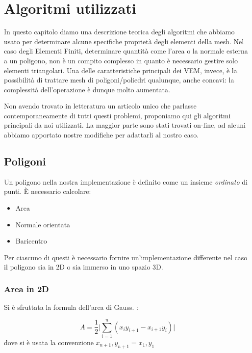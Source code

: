 \documentclass[oneside,12pt]{book}  %
\theoremstyle{plain}
\theoremstyle{definition}
\theoremstyle{remark}
\numberwithin{equation}{chapter} %
\begin{document}

\chapter{Algoritmi utilizzati}
\label{ch:algorithms}
In questo capitolo diamo una descrizione teorica degli algoritmi che
abbiamo usato per determinare alcune specifiche propriet\`a degli
elementi della mesh. Nel caso degli Elementi Finiti, determinare
quantit\`a come l'area o la normale esterna a un poligono, non \`e un
compito complesso in quanto \`e necessario gestire solo elementi
triangolari.
Una delle caratteristiche principali dei VEM, invece, \`e la
possibilit\`a di trattare mesh di poligoni/poliedri qualunque, anche concavi:
la complessit\`a dell'operazione \`e dunque molto aumentata.

Non avendo trovato in letteratura un articolo unico che parlasse
contemporaneamente di tutti questi problemi, proponiamo qui gli
algoritmi principali da noi utilizzati. La maggior parte sono stati
trovati on-line, ad alcuni abbiamo apportato nostre modifiche per
adattarli al nostro caso.

\section{Poligoni}
Un poligono nella nostra implementazione \`e definito come un insieme
\textit{ordinato} di punti. 
\`E necessario calcolare:
\begin{itemize}
\item Area
\item Normale orientata
\item Baricentro
\end{itemize}
Per ciascuno di questi \`e necessario fornire un'implementazione
differente nel caso il poligono sia in 2D o sia immerso in uno spazio 3D.

\subsection{Area in 2D}
Si \`e sfruttata la formula dell'area di Gauss. \cite{wiki:areaGauss}:

$$ A=\frac{1}{2} \bigg | \sum_{i=1}^n (x_iy_{i+1}-x_{i+1}y_i) \bigg
|$$
dove si \`e usata la convenzione $x_{n+1},y_{n+1}=x_1,y_1$

\end{document}
